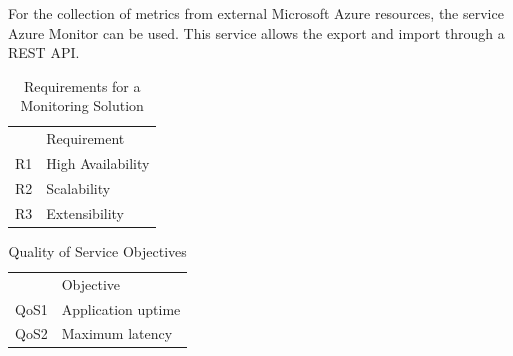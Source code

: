 For the collection of metrics from external Microsoft Azure resources, the service Azure Monitor can be used.
This service allows the export and import through a REST API.

\begin{table}[]
\begin{tabular}{ll}
   & Requirement       \\
R1 & High Availability \\
R2 & Scalability       \\
R3 & Extensibility    
\end{tabular}
\caption{Requirements for a Monitoring Solution}
\label{tab:requirements}
\end{table}

\begin{table}[]
\begin{tabular}{ll}
     & Objective                                   \\
QoS1 & Application uptime                          \\
QoS2 & Maximum latency                             \\
\end{tabular}
\caption{Quality of Service Objectives}
\label{tab:qos_objectives}
\end{table}

